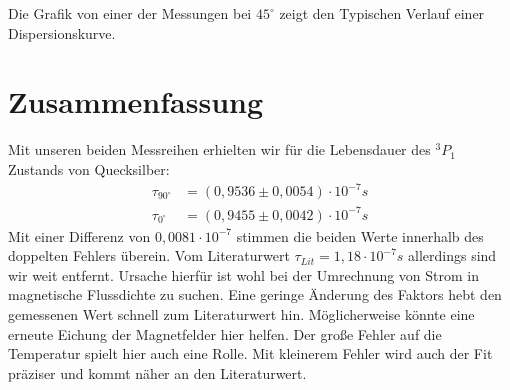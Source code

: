 \documentclass[12pt]{article}
\begin{document}
Die Grafik von einer der Messungen bei $45^\circ$ zeigt den Typischen Verlauf einer Dispersionskurve.

\section{Zusammenfassung}
Mit unseren beiden Messreihen erhielten wir für die Lebensdauer des $^3P_1$ Zustands von Quecksilber:
\begin{align*}
 \tau_{90^\circ} &= (0,9536 \pm 0,0054) \cdot 10^{-7}s \\
 \tau_{0^\circ} &= (0,9455 \pm 0,0042) \cdot 10^{-7}s
\end{align*}
Mit einer Differenz von $0,0081 \cdot 10^{-7}$ stimmen die beiden Werte innerhalb des doppelten Fehlers überein. Vom Literaturwert
$\tau_{Lit} = 1,18 \cdot 10^{-7}s$ allerdings sind wir weit entfernt. Ursache hierfür ist wohl bei der Umrechnung von Strom in magnetische Flussdichte
zu suchen. Eine geringe Änderung des Faktors hebt den gemessenen Wert schnell zum Literaturwert hin. Möglicherweise könnte eine erneute Eichung der
Magnetfelder hier helfen. Der große Fehler auf die Temperatur spielt hier auch eine Rolle. Mit kleinerem Fehler wird auch der Fit präziser und kommt näher
an den Literaturwert.
\end{document}
